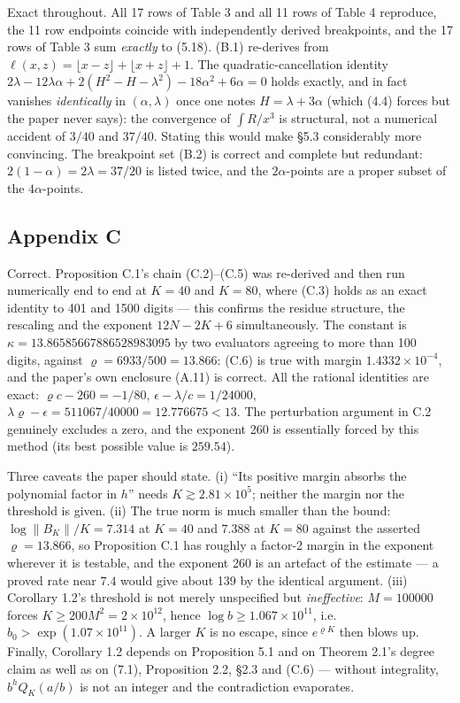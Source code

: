 \documentclass[11pt]{article}
\theoremstyle{definition}
\begin{document}
Exact throughout. All 17 rows of Table 3 and all 11 rows of Table 4 reproduce, the 11 row
endpoints coincide with independently derived breakpoints, and the 17 rows of Table 3 sum
\emph{exactly} to (5.18). (B.1) re-derives from $\ell(x,z)=\lfloor x-z\rfloor+\lfloor x+z\rfloor+1$.
The quadratic-cancellation identity
$2\lambda-12\lambda\alpha+2(H^2-H-\lambda^2)-18\alpha^2+6\alpha=0$
holds exactly, and in fact vanishes \emph{identically} in $(\alpha,\lambda)$ once one notes
$H=\lambda+3\alpha$ (which (4.4) forces but the paper never says): the convergence of
$\int R/x^3$ is structural, not a numerical accident of $3/40$ and $37/40$. Stating this would
make \S5.3 considerably more convincing. The breakpoint set (B.2) is correct and complete but
redundant: $2(1-\alpha)=2\lambda=37/20$ is listed twice, and the $2\alpha$-points are a proper
subset of the $4\alpha$-points.

\subsection{Appendix C}

Correct. Proposition C.1's chain (C.2)--(C.5) was re-derived and then run numerically end to end
at $K=40$ and $K=80$, where (C.3) holds as an exact identity to 401 and 1500 digits --- this
confirms the residue structure, the rescaling and the exponent $12N-2K+6$ simultaneously. The
constant is $\kappa=13.86585667886528983095$ by two evaluators agreeing to more than 100 digits,
against $\varrho=6933/500=13.866$: (C.6) is true with margin $1.4332\times10^{-4}$, and the
paper's own enclosure (A.11) is correct. All the rational identities are exact:
$\varrho c-260=-1/80$, $\epsilon-\lambda/c=1/24000$, $\lambda\varrho-\epsilon=511067/40000=12.776675<13$.
The perturbation argument in C.2 genuinely excludes a zero, and the exponent 260 is essentially
forced by this method (its best possible value is $259.54$).

Three caveats the paper should state. (i) ``Its positive margin absorbs the polynomial factor in
$h$'' needs $K\gtrsim2.81\times10^5$; neither the margin nor the threshold is given. (ii) The
true norm is much smaller than the bound: $\log\|B_K\|/K=7.314$ at $K=40$ and $7.388$ at $K=80$
against the asserted $\varrho=13.866$, so Proposition C.1 has roughly a factor-2 margin in the
exponent wherever it is testable, and the exponent 260 is an artefact of the estimate --- a
proved rate near $7.4$ would give about 139 by the identical argument. (iii) Corollary 1.2's
threshold is not merely unspecified but \emph{ineffective}: $M=100000$ forces
$K\ge200M^2=2\times10^{12}$, hence $\log b\ge1.067\times10^{11}$, i.e.\
$b_0>\exp(1.07\times10^{11})$. A larger $K$ is no escape, since $e^{\varrho K}$ then blows up.
Finally, Corollary 1.2 depends on Proposition 5.1 and on Theorem 2.1's degree claim as well as
on (7.1), Proposition 2.2, \S2.3 and (C.6) --- without integrality, $b^hQ_K(a/b)$ is not an
integer and the contradiction evaporates.
\end{document}
